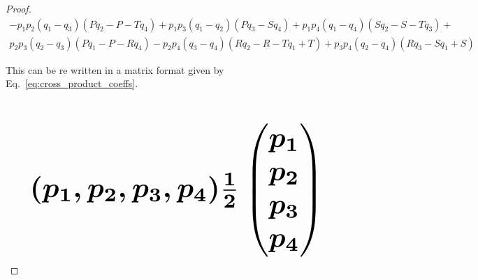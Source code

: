 \documentclass[10pt]{article}
\providecommand{\DIFaddbegin}{} %
\providecommand{\DIFaddend}{} %
\providecommand{\DIFdelbegin}{} %
\providecommand{\DIFdelend}{} %
\newcommand{\DIFscaledelfig}{0.5}
\newlength{\DIFdelgraphicswidth} %
\newlength{\DIFdelgraphicsheight} %
\newcommand{\DIFaddincludegraphics}[2][]{{\color{blue}\fbox{\DIFOincludegraphics[#1]{#2}}}} %
\newcommand{\DIFdelincludegraphics}[2][]{%
\sbox{\DIFdelgraphicsbox}{\DIFOincludegraphics[#1]{#2}}%
\settoboxwidth{\DIFdelgraphicswidth}{\DIFdelgraphicsbox} %
\settoboxtotalheight{\DIFdelgraphicsheight}{\DIFdelgraphicsbox} %
\scalebox{\DIFscaledelfig}{%
\parbox[b]{\DIFdelgraphicswidth}{\usebox{\DIFdelgraphicsbox}\\[-\baselineskip] \rule{\DIFdelgraphicswidth}{0em}}\llap{\resizebox{\DIFdelgraphicswidth}{\DIFdelgraphicsheight}{%
\setlength{\unitlength}{\DIFdelgraphicswidth}%
\begin{picture}(1,1)%
\thicklines\linethickness{2pt} %
{\color[rgb]{1,0,0}\put(0,0){\framebox(1,1){}}}%
{\color[rgb]{1,0,0}\put(0,0){\line( 1,1){1}}}%
{\color[rgb]{1,0,0}\put(0,1){\line(1,-1){1}}}%
\end{picture}%
}\hspace*{3pt}}} %
} %
\DeclareRobustCommand{\DIFaddbegin}{\DIFOaddbegin \let\includegraphics\DIFaddincludegraphics} %
\DeclareRobustCommand{\DIFaddend}{\DIFOaddend \let\includegraphics\DIFOincludegraphics} %
\DeclareRobustCommand{\DIFdelbegin}{\DIFOdelbegin \let\includegraphics\DIFdelincludegraphics} %
\DeclareRobustCommand{\DIFdelend}{\DIFOaddend \let\includegraphics\DIFOincludegraphics} %
\begin{document}
\begin{proof}
    \begingroup
    \footnotesize
    \DIFdelbegin %
\DIFdelend \DIFaddbegin \begin{align*}
    - p_{1} p_{2} (q_{1} - q_{3}) (P q_{2} - P - T q_{4}) + p_{1} p_{3} (q_{1} - q_{2}) (P q_{3} - S q_{4}) + p_{1} p_{4} (q_{1} - q_{4}) (S q_{2} - S - T q_{3}) + \\
    p_{2} p_{3} (q_{2} - q_{3}) (P q_{1} - P - R q_{4}) - p_{2} p_{4} (q_{3} - q_{4}) (R q_{2} - R - T q_{1} + T) + p_{3} p_{4} (q_{2} - q_{4}) (R q_{3} - S q_{1} + S)
    \end{align*}\DIFaddend 
    \endgroup

    This can be re written in a matrix format given by
    Eq.~\ref{eq:cross_product_coeffs}.

    \DIFdelbegin %
\mbox{%
\( 
\)
}%

\DIFdelend \DIFaddbegin \begin{equation}\label{eq:cross_product_coeffs}
        \resizebox{0.9\linewidth}{!}{\arraycolsep=2.5pt%
        \boldmath%
\mbox{%
\(
        (p_1, p_2, p_3, p_4) \frac{1}{2}  \begin{pmatrix}
        p_1 \\
        p_2 \\
        p_3 \\
        p_4 \end{pmatrix}
        \)
}%
}
    \end{equation}\DIFaddend 


\end{proof}
\end{document}
